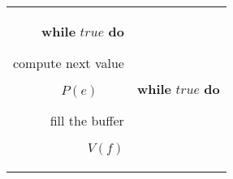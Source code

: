 \begin{algorithm}%
\begin{centering}%
\begin{tabular}{r||l}%
\begin{minipage}[t]{2.25in}%
\begin{singlespaced}%

\begin{code}
\textbf{while} $\mathit{true}$ \textbf{do}

\begin{indent}
\item compute next value

\item $P(e)\qquad $

\item fill the buffer

\item $V(f)$
\end{indent}
\end{code}

\end{singlespaced}%
\end{minipage}%
&%
\begin{minipage}[t]{2.25in}%
\begin{singlespaced}%

\begin{code}
\textbf{while} $\mathit{true}$ \textbf{do}


\end{code}
\end{singlespaced}
\end{minipage}
\end{tabular}
\end{centering}
\end{algorithm}
